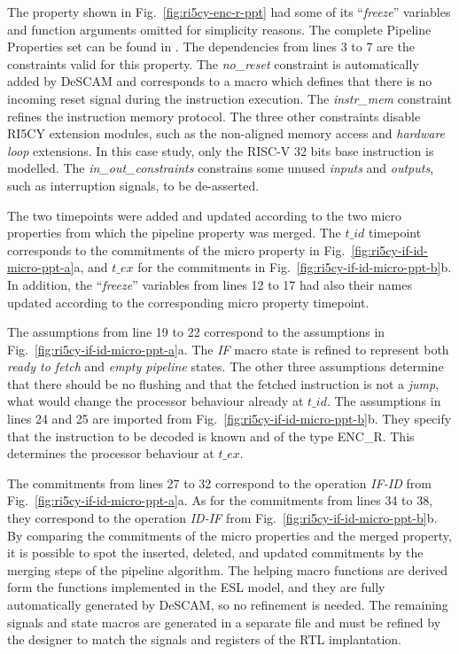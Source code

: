 The property shown in Fig.~\ref{fig:ri5cy-enc-r-ppt} had some of its “\textit{freeze}” variables and function arguments omitted for simplicity reasons. The complete Pipeline Properties set can be found in \cite{descam}. The dependencies from lines 3 to 7 are the constraints valid for this property. The \textit{no\_reset} constraint is automatically added by DeSCAM and corresponds to a macro which defines that there is no incoming reset signal during the instruction execution. The \textit{instr\_mem} constraint refines the instruction memory protocol. The three other constraints disable RI5CY extension modules, such as the non-aligned memory access and \textit{hardware loop} extensions. In this case study, only the RISC-V 32 bits base instruction is modelled. The \textit{in\_out\_constraints} constrains some unused \textit{inputs} and \textit{outputs}, such as interruption signals, to be de-asserted. 

The two timepoints were added and updated according to the two micro properties from which the pipeline property was merged. The $t\_id$ timepoint corresponds to the commitments of the micro property in Fig.~\ref{fig:ri5cy-if-id-micro-ppt-a}a, and $t\_ex$ for the commitments in Fig.~\ref{fig:ri5cy-if-id-micro-ppt-b}b. In addition, the “\textit{freeze}” variables from lines 12 to 17 had also their names updated according to the corresponding micro property timepoint.

The assumptions from line 19 to 22 correspond to the assumptions in Fig.~\ref{fig:ri5cy-if-id-micro-ppt-a}a. The \textit{IF} macro state is refined to represent both \textit{ready to fetch} and \textit{empty pipeline} states. The other three assumptions determine that there should be no flushing and that the fetched instruction is not a \textit{jump}, what would change the processor behaviour already at $t\_id$. The assumptions in lines 24 and 25 are imported from Fig.~\ref{fig:ri5cy-if-id-micro-ppt-b}b. They specify that the instruction to be decoded is known and of the type ENC\_R. This determines the processor behaviour at $t\_ex$.

The commitments from lines 27 to 32 correspond to the operation \textit{IF-ID} from Fig.~\ref{fig:ri5cy-if-id-micro-ppt-a}a. As for the commitments from lines 34 to 38, they correspond to the operation \textit{ID-IF} from Fig.~\ref{fig:ri5cy-if-id-micro-ppt-b}b. By comparing the commitments of the micro properties and the merged property, it is possible to spot the inserted, deleted, and updated commitments by the merging steps of the pipeline algorithm. The helping macro functions are derived form the functions implemented in the ESL model, and they are fully automatically generated by DeSCAM, so no refinement is needed. The remaining signals and state macros are generated in a separate file and must be refined by the designer to match the signals and registers of the RTL implantation. 

